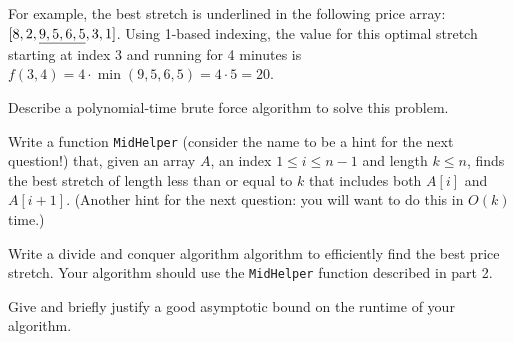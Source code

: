 \documentclass[11pt,fleqn]{exam}
\newif\ifsolutions\solutionsfalse
\begin{document}
	For example, the best stretch is underlined in the following price array: $[8, 2, \uline{9, 5, 6, 5}, 3, 1]$. Using 1-based indexing, the value for this optimal stretch starting at index 3 and running for 4 minutes is $f(3,4) = 4 \cdot \min(9,5,6,5) = 4 \cdot 5 = 20$.

 \begin{questions}
    \question[3] Describe a polynomial-time brute force algorithm to solve this problem.

    \ifsolutions\fi 

    \question[3] Write a function \texttt{MidHelper} (consider the name to be a hint for the next question!) that, given an array $A$, an index $1 \le i \le n-1$ and length $k \le n$, finds the best stretch of length less than or equal to $k$ that includes both $A[i]$ and $A[i+1]$. (Another hint for the next question: you will want to do this in $O(k)$ time.)

    \ifsolutions\fi

     \question[5] Write a divide and conquer algorithm algorithm to efficiently find the best price stretch. Your algorithm should use the \texttt{MidHelper} function described in part 2.

     \ifsolutions\fi 

     \question[2] Give and briefly justify a good asymptotic bound on the runtime of your algorithm.

     \ifsolutions\fi 
     
 \end{questions}
\end{document}
